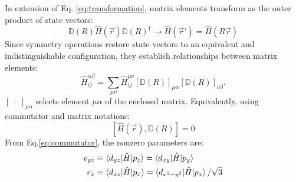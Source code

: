 \documentclass[twocolumn,showpacs,preprintnumbers,superscriptaddress,prb,floatfix,aps,10pt]{revtex4-1}
\newcommand*{\ham}{\hat{H}}
\newcommand*{\wignerD}{\mathbb{D}(R)}
\begin{document}
In extension of Eq. \ref{eq:transformation}, matrix elements transform as the outer product of state vectors:
%
\begin{equation}
\label{eq:transformation_matrix}
\wignerD \ham(\vec{r}) \wignerD^\dag \rightarrow \ham(\vec{r}') = \ham( R\vec{r})
\end{equation}
%
Since symmetry operations restore state vectors to an equivalent and indistinguishable configuration, they establish relationships between matrix elements:
\begin{equation}
\label{eq:stab}
\ham^{\alpha\beta}_{ij} = \sum_{\mu\nu} \ham^{\mu\nu}_{ij} \left[\wignerD\right]_{\mu\alpha} \left[\wignerD\right]_{\nu\beta}.
\end{equation}
%
$\left[\phantom{.}\cdot\phantom{.}\right]_{\mu\alpha}$ selects element $\mu\alpha$ of the enclosed matrix. Equivalently, using commutator and matrix notations:
%
\begin{equation}
\label{eq:commutator}
[\ham(\vec{r}),\wignerD] = 0
\end{equation}
%
From Eq.\ref{eq:commutator}, the nonzero parameters are:
\begin{align}
v_{yz} &
\equiv \braket{d_{yz} | \ham | p_z} 
= \braket{d_{xy} | \ham | p_y} \\
v_{x} &
\equiv \braket{d_{xz} | \ham | p_x} 
= \braket{d_{x^2-y^2} | \ham | p_x} / \sqrt{3}
\end{align}
\end{document}
